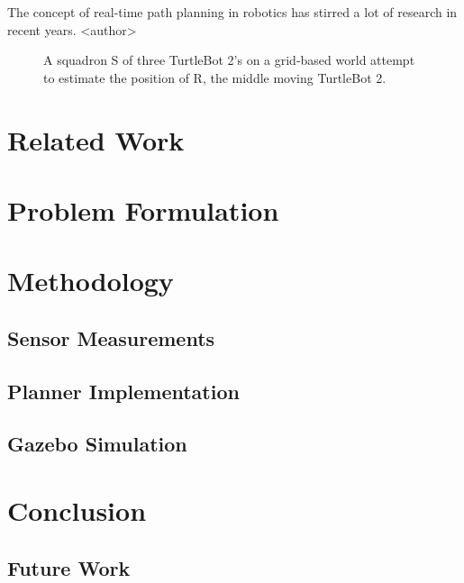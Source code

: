 \documentclass[conference]{IEEEtran} \usepackage[T1]{fontenc} \usepackage[backend=biber, style=ieee]{biblatex}
\begin{document}
The concept of real-time path planning in robotics has stirred a lot of research in recent years. <author> 

\begin{figure}
\label{pic1} 
\centering 
\caption{A squadron S of three TurtleBot 2's on a grid-based world attempt to estimate the position of R, the middle moving TurtleBot 2.}
\end{figure}

\section{Related Work} \label{Related Work}

\section{Problem Formulation} \label{Problem Formulation}

\section{Methodology} \label{Methodology}

\subsection{Sensor Measurements} \label{Sensor Measurements}

\subsection{Planner Implementation} \label{Planner Implementation}

\subsection{Gazebo Simulation} \label{Gazebo Simulation}

\section{Conclusion} \label{Conclusion} 

\subsection{Future Work}

\printbibliography
\end{document}
